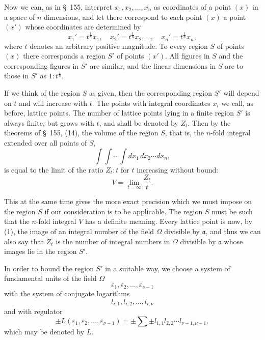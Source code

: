 \documentclass[11pt]{article}
\begin{document}
Now we can, as in \S~155, interpret $x_1,x_2,\ldots,x_n$ as coordinates of a point $(x)$ in a space of $n$ dimensions, and let there correspond to each point $(x)$ a point $(x')$ whose coordinates are determined by
\begin{equation}
x_1'=t^{\frac1n}x_1,
\quad x_2'=t^{\frac1n}x_2,
\ldots,
\quad x_n'=t^{\frac1n}x_n,
\tag{4}
\end{equation}
where $t$ denotes an arbitrary positive magnitude. To every region $S$ of points $(x)$ there corresponds a region $S'$ of points $(x')$. All figures in $S$ and the corresponding figures in $S'$ are similar, and the linear dimensions in $S$ are to those in $S'$ as $1:t^{\frac1n}$.

If we think of the region $S$ as given, then the corresponding region $S'$ will depend on $t$ and will increase with $t$. The points with integral coordinates $x_i$ we call, as before, lattice points. The number of lattice points lying in a finite region $S'$ is always finite, but grows with $t$, and shall be denoted by $Z_t$. Then by the theorems of \S~155, (14), the volume of the region $S$, that is, the $n$-fold integral extended over all points of $S$,
\[
\int\!\int\cdots\int dx_1\,dx_2\cdots dx_n,
\]
is equal to the limit of the ratio $Z_t:t$ for $t$ increasing without bound:
\begin{equation}
V=\lim_{t=\infty}\frac{Z_t}{t}.
\tag{5}
\end{equation}

This at the same time gives the more exact precision which we must impose on the region $S$ if our consideration is to be applicable. The region $S$ must be such that the $n$-fold integral $V$ has a definite meaning. Every lattice point is now, by (1), the image of an integral number of the field $\Omega$ divisible by $\mathfrak a$, and thus we can also say that $Z_t$ is the number of integral numbers in $\Omega$ divisible by $\mathfrak a$ whose images lie in the region $S'$.

In order to bound the region $S'$ in a suitable way, we choose a system of fundamental units of the field $\Omega$
\[
\varepsilon_1,\varepsilon_2,\ldots,\varepsilon_{\nu-1}
\]
with the system of conjugate logarithms
\[
l_{i,1},l_{i,2},\ldots,l_{i,\nu}
\]
and with regulator
\begin{equation}
\pm L(\varepsilon_1,\varepsilon_2,\ldots,\varepsilon_{\nu-1})=\pm\sum\pm l_{1,1}l_{2,2}\cdots l_{\nu-1,\nu-1},
\tag{6}
\end{equation}
which may be denoted by $L$.
\end{document}
